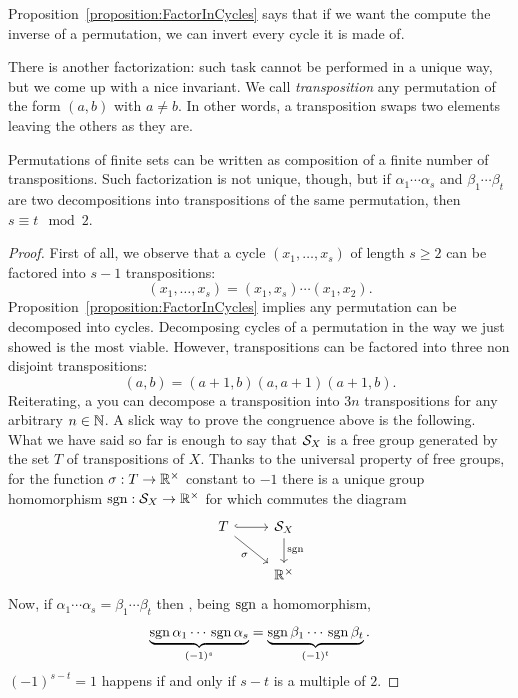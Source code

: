 Proposition~\ref{proposition:FactorInCycles} says that if we want the compute the inverse of a permutation, we can invert every cycle it is made of.

There is another factorization: such task cannot be performed in a unique way, but we come up with a nice invariant. We call {\em transposition} any permutation of the form \((a, b)\) with \(a \ne b\). In other words, a transposition swaps two elements leaving the others as they are.

\begin{proposition}
Permutations of finite sets can be written as composition of a finite number of transpositions. Such factorization is not unique, though, but if \(\alpha_1 \cdots{} \alpha_s \) and \(\beta_1 \cdots{} \beta_t\) are two decompositions into transpositions of the same permutation, then \(s \equiv t \mod 2\).
\end{proposition}

\begin{proof}
First of all, we observe that a cycle \((x_1, \dots{}, x_s)\) of length \(s \ge 2\) can be factored into \(s-1\) transpositions:
\[(x_1, \dots{}, x_s) = (x_1, x_s) \cdots (x_1, x_2) .\]
Proposition~\ref{proposition:FactorInCycles} implies any permutation can be decomposed into cycles. Decomposing cycles of a permutation in the way we just showed is the most viable. However, transpositions can be factored into three non disjoint transpositions:
\[(a, b) = (a+1, b) (a, a+1) (a+1, b) .\]
Reiterating, a you can decompose a transposition into \(3n\) transpositions for any arbitrary \(n \in \mathbb N\). A slick way to prove the congruence above is the following. What we have said so far is enough to say that \(\mathcal S_X\) is a free group generated by the set \(T\) of transpositions of \(X\). Thanks to the universal property of free groups, for the function \(\sigma : T \to \mathbb R^\times\) constant to \(-1\) there is a unique group homomorphism \(\operatorname{sgn} : \mathcal S_X \to \mathbb R^\times\) for which commutes the diagram
\[\begin{tikzcd}
T \ar[r, hookrightarrow] \ar["\sigma", dr, swap] & \cals_X \ar["\sgn", d] \\
& \rr^\times
\end{tikzcd}\]
Now, if \(\alpha_1 \cdots{} \alpha_s = \beta_1 \cdots{} \beta_t\) then
, being \(\operatorname{sgn}\) a homomorphism,
\[\underbrace{\operatorname{sgn}\alpha_1 \cdots{} \operatorname{sgn}\alpha_s}_{(-1)^s} = \underbrace{\operatorname{sgn}\beta_1 \cdots{} \operatorname{sgn}\beta_t}_{(-1)^t} .\]
\((-1)^{s-t} = 1\) happens if and only if \(s-t\) is a multiple of \(2\).
\end{proof}


